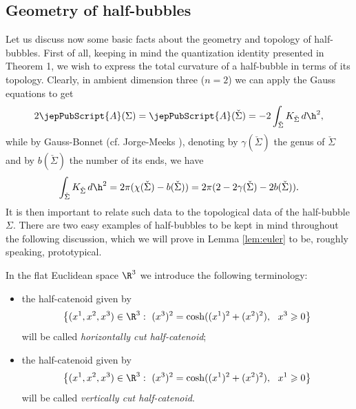         	\subsection{Geometry of half-bubbles}\label{subs:geomhalf}
        	
        	Let us discuss now some basic facts about the geometry and topology of half-bubbles. First of all, keeping in mind the quantization identity presented in Theorem 1, we wish to express the total curvature of a half-bubble in terms of its topology.
        	Clearly, in ambient dimension three ($n=2$) we can apply the Gauss equations to get
        	\begin{equation}\label{eq:half2nd}
        	2{\jepPubScript{A}}(\Sigma)={\jepPubScript{A}}(\check{\Sigma})=-2\int_{\check{\Sigma}} K_{\check{\Sigma}}\,d\h^2,
        	\end{equation}
        	while by Gauss-Bonnet (cf. Jorge-Meeks \cite{JM83}), denoting by $\gamma(\check{\Sigma})$ the genus of $\check{\Sigma}$ and by $b(\check{\Sigma})$ the number of its ends, we have
        	\begin{equation}\label{eq:GBcomplete}
        	\int_{\check{\Sigma}} K_{\check{\Sigma}}\,d\h^2=2\pi (\chi(\check{\Sigma})-b(\check{\Sigma}))=2\pi(2-2\gamma(\check{\Sigma})-2b(\check{\Sigma})) .
        	\end{equation}
        	It is then important to relate such data to the topological data of the half-bubble $\Sigma$. There are two easy examples of half-bubbles to be kept in mind throughout the following discussion, which we will prove in Lemma \ref{lem:euler} to be, roughly speaking, prototypical.
        	
        	\begin{definition}\label{def:horcurvercut} In the flat Euclidean space $\R^3$ we introduce the following terminology:
        		\begin{itemize} \item{the half-catenoid given by
        			\[
        			\left\{(x^1, x^2, x^3)\in \R^3 : \ (x^3)^2=\cosh ((x^1)^2+(x^2)^2), \ \ x^3\geqslant 0 \right\}
        			\]
        			will be called \textsl{horizontally cut half-catenoid};}	
       \item{the half-catenoid given by
        			\[
        		\left\{	(x^1, x^2, x^3)\in \R^3 : \ (x^3)^2=\cosh ((x^1)^2+(x^2)^2), \ \ x^1\geqslant 0 \right\}	
        			\]
        			will be called \textsl{vertically cut half-catenoid}.}
        			\end{itemize}
        	\end{definition}
        	
